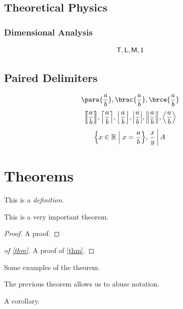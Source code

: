 \documentclass{article}
\begin{document}
\subsection{Theoretical Physics}

\subsubsection{Dimensional Analysis}
\[
    \mathsf{T}, \mathsf{L}, \mathsf{M}, \mathsf{1}
\]

\subsection{Paired Delimiters}
\[
    \para{\frac{a}{b}}, \brac{\frac{a}{b}}, \brce{\frac{a}{b}}
\]
\[
    \bbrac{\frac{a}{b}}, \ceil{\frac{a}{b}}, \floor{\frac{a}{b}}, \abs{\frac{a}{b}}, \norm{\frac{a}{b}}, \angBrac{\frac{a}{b}}
\]
\[
    \set{x \in \RR}{x = \frac{a}{b}}, \bound{\Conditional{\frac{x}{y}}{A}}
\]

\section{Theorems}
\begin{definition}
    \label{def}%
    This is a \emph{definition}. \lipsum[1]
\end{definition}

\begin{theorem}
    \label{thm}%
    This is a very important theorem. \lipsum[2]
\end{theorem}

\begin{proof}
    A proof. \lipsum[3]
\end{proof}

\begin{proof}[of \autoref{thm}]
    A proof of \autoref{thm}. \lipsum[4]
\end{proof}

\begin{examples}
    Some examples of the theorem. \lipsum[5]
\end{examples}

\begin{notation}
    The previous theorem allows us to abuse notation. \lipsum[6]
\end{notation}

\begin{corollary}
    \label{cor}%
    A corollary. \lipsum[7]
\end{corollary}
\end{document}
